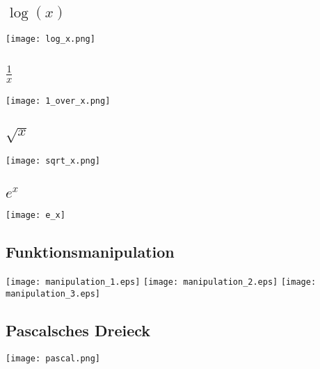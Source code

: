 \begin{landscape}\begin{multicols}{3}

\subsection{\texorpdfstring{$\log(x)$}{log(x)}}
\texttt{[image: log\_x.png]}

\subsection{\texorpdfstring{$\frac{1}{x}$}{1/x}}
\texttt{[image: 1\_over\_x.png]}

\subsection{\texorpdfstring{$\sqrt{x}$}{x^(1/x)}}
\texttt{[image: sqrt\_x.png]}

\subsection{$e^x$}
\texttt{[image: e\_x]}

\subsection{Funktionsmanipulation}
\texttt{[image: manipulation\_1.eps]}
\texttt{[image: manipulation\_2.eps]}
\texttt{[image: manipulation\_3.eps]}

\subsection{Pascalsches Dreieck}
\texttt{[image: pascal.png]}

\end{multicols}\end{landscape}
